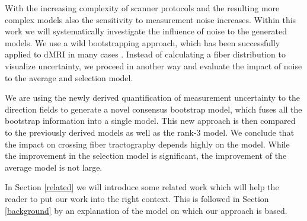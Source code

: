 With the increasing complexity of scanner protocols and the resulting more
complex models also the sensitivity to measurement noise increases. Within this work
we will systematically investigate the influence of noise to the generated
models. We use a wild bootstrapping approach, which has been
successfully applied to dMRI in many cases \cite{Jones:2008}. Instead of
calculating a fiber distribution to visualize uncertainty, we proceed in
another way and evaluate the impact of noise to the average and selection model.

We are using the newly derived quantification of measurement uncertainty to the
direction fields to generate a novel consensus bootstrap
model, which fuses all the bootstrap information into a single model. This new
approach is then compared to the previously derived models as well as the
rank-$3$ model. We conclude that the
impact on crossing fiber tractography depends highly on the model. While the
improvement in the selection model is significant, the improvement of the
average model is not large. 

In Section \ref{related} we will introduce some related work which will help the
reader to put our work into the right context. This is followed in Section \ref{background} by an
explanation of the model on which our approach is based.
